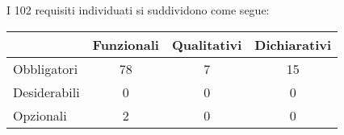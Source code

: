 I 102 requisiti individuati si suddividono come segue:
\begin{center}
  \centering
  \begin{tabular}{|l|c|c|c|}
    \hline
      & Funzionali & Qualitativi & Dichiarativi   \\
\hline
Obbligatori &      78     &    7     & 15       \\
\hline
Desiderabili &     0     &     0     & 0    \\
\hline
Opzionali   &      2     &    0     & 0    \\
\hline
  \end{tabular}
\end{center}

